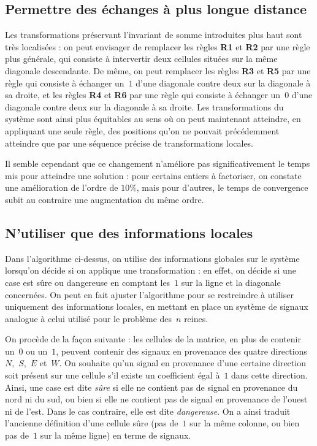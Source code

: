 \documentclass[11pt, openany, a4paper]{article}
\begin{document}
\subsection*{Permettre des échanges à plus longue distance}

Les transformations préservant l'invariant de somme introduites plus haut sont très localisées : on peut envisager de remplacer les règles \textbf{R1} et \textbf{R2} par une règle plus générale, qui consiste à intervertir deux cellules situées sur la même diagonale descendante. De même, on peut remplacer les règles \textbf{R3} et \textbf{R5} par une règle qui consiste à échanger un~$1$ d'une diagonale contre deux sur la diagonale à sa droite, et les règles \textbf{R4} et \textbf{R6} par une règle qui consiste à échanger un~$0$ d'une diagonale contre deux sur la diagonale à sa droite. Les transformations du système sont ainsi plus équitables au sens où on peut maintenant atteindre, en appliquant une seule règle, des positions qu'on ne pouvait précédemment atteindre que par une séquence précise de transformations locales. 

Il semble cependant que ce changement n'améliore pas significativement le temps mis pour atteindre une solution : pour certains entiers à factoriser, on constate une amélioration de l'ordre de $10\%$, mais pour d'autres, le temps de convergence subit au contraire une augmentation du même ordre.   


\subsection*{N'utiliser que des informations locales}

Dans l'algorithme ci-dessus, on utilise des informations globales sur le système lorsqu'on décide si on applique une transformation : en effet, on décide si une case est sûre ou dangereuse en comptant les~$1$ sur la ligne et la diagonale concernées. On peut en fait ajuster l'algorithme pour se restreindre à utiliser uniquement des informations locales, en mettant en place un système de signaux analogue à celui utilisé pour le problème des~$n$ reines. 

On procède de la façon suivante : les cellules de la matrice, en plus de contenir un~$0$ ou un~$1$, peuvent contenir des signaux en provenance des quatre directions~$N$,~$S$,~$E$ et~$W$. On souhaite qu'un signal en provenance d'une certaine direction soit présent sur une cellule s'il existe un coefficient égal à~$1$ dans cette direction. Ainsi, une case est dite \emph{sûre} si elle ne contient pas de signal en provenance du nord ni du sud, ou bien si elle ne contient pas de signal en provenance de l'ouest ni de l'est. Dans le cas contraire, elle est dite \emph{dangereuse}. On a ainsi traduit l'ancienne définition d'une cellule sûre (pas de~$1$ sur la même colonne, ou bien pas de~$1$ sur la même ligne) en terme de signaux.
\end{document}
